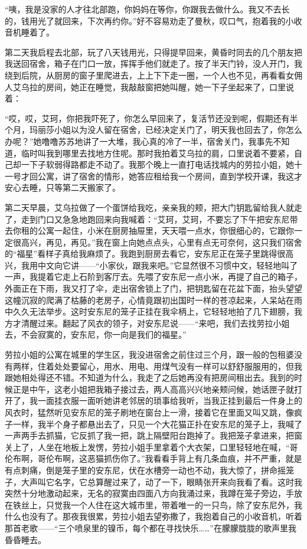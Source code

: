 \par “咦，我是没家的人才往北部跑，你妈妈在等你，你跟我去做什么。我又不去长的，钱用光了就回来，下次再约你。”好不容易劝走了曼秋，叹口气，抱着我的小收音机睡着了。
\par 第二天我启程去北部，玩了八天钱用光，只得提早回来，黄昏时同去的几个朋友把我送回宿舍，箱子在门口一放，挥挥手他们就走了。按了半天门铃，没人开门，我绕到后院，从厨房的窗子里爬进去，上上下下走一圈，一个人也不见，再看看女佣人艾乌拉的房间，她正在睡觉，我敲敲窗把她叫醒，她一下子坐起来了，口里说着：
\par “哎，哎，艾珂，你把我吓死了，你怎么早回来了，复活节还没到呢，假期还有半个月，玛丽莎小姐以为没人留在宿舍，已经决定关门了，明天我也回去了，你怎么办呢？”她噜噜苏苏地讲了一大堆，我心真的冷了一半，宿舍关门，我事先不知道，临时叫我到哪里去找地方住呢。那时我拍着艾乌拉的肩，口里说着不要紧，自己却一下子软弱得路都走不动了。我那个晚上一直打电话找城内的劳拉小姐，她十一号才回公寓，讲了宿舍的情形，她答应租给我一个房间，直到学校开课，我这才安心去睡，只等第二天搬家了。
\par 第二天早晨，艾乌拉做了一个蛋饼给我吃，亲亲我的颊，把大门钥匙留给我人就走了，走到门口又急急地跑回来向我喊着：“艾珂，艾珂，不要忘了下午把安东尼带去你租的公寓一起住，小米在厨房抽屉里，天天喂一点水，你很细心的，它跟你一定很高兴，再见，再见。”我在窗上向她点点头，心里有点无可奈何，这只我们宿舍的“福星”看样子真给我麻烦了。我跑到厨房去看它，安东尼正在笼子里跳得很高兴，我用中文向它讲——“小家伙，跟我来吧。”它显然很不习惯中文，轻轻地叫了一声，我提着它走上石阶到客厅去。先喂了安东尼一点小米，再提了自己的箱子，外面正在下雨，我又打了伞，走出宿舍锁上了门，把钥匙留在花盆下面，抬头望望这幢沉寂的爬满了枯藤的老房子，心情竟跟初出国时一样的苍凉起来，人呆站在雨中久久无法举步。这时安东尼的笼子正挂在我伞柄上，它轻轻地拍了几下翅膀，我方才清醒过来。翻起了风衣的领子，对安东尼说——“来吧，我们去找劳拉小姐去，不会寂寞的，安东尼，你一向是我们的福星。”
\par 劳拉小姐的公寓在城里的学生区，我没进宿舍之前住过三个月，跟一般的包租婆没有两样，住着处处要留心，用水、用电、用煤气没有一样可以舒舒服服用的，但我跟她相处得还不错。不知道为什么，我走了之后她再没有把房间租出去。我到的时候正是中午，这老小姐把我箱子接过去，两人高高兴兴地亲颊问候，她话匣子就打开了，我一面挂衣服一面听她讲老邻居的琐事给我听，当我正挂到最后一件身上的风衣时，猛然听见安东尼的笼子刷地在窗台上一滑，接着它在里面又叫又跳，像疯子一样，我半个身子都悬出去了，只见一个大花猫正扑在安东尼的笼子上，我喊了一声两手去抓猫，它反抓了我一把，跳上隔壁阳台跑掉了。我把笼子拿进来，把窗关上了，人坐在地板上发愣，劳拉小姐手里拿着个大衣架，口里轻轻地在喊，“哥伦布啊，哥伦布啊，这恶猫抓伤你了。”我看看手背上有几条血痕，并不严重，就是有点刺痛，倒是笼子里的安东尼，伏在水槽旁一动也不动，我大惊了，拼命摇笼子，大声叫它名字，它总算醒过来了，动了一下，眼睛张开来向我看了看。这时我突然十分地激动起来，无名的寂寞由四面八方向我涌过来，我蹲在笼子旁边，手放在铁丝上，只觉我一个人住在这大城市里，带着唯一的一只鸟，除了安东尼外，我什么也没有了。那夜我很累，劳拉小姐去望弥撒了，我抱着自己的小收音机，听着那首老歌——“三个喷泉里的镍币，每个都在寻找快乐……”在朦朦胧胧的歌声里我昏昏睡去。
